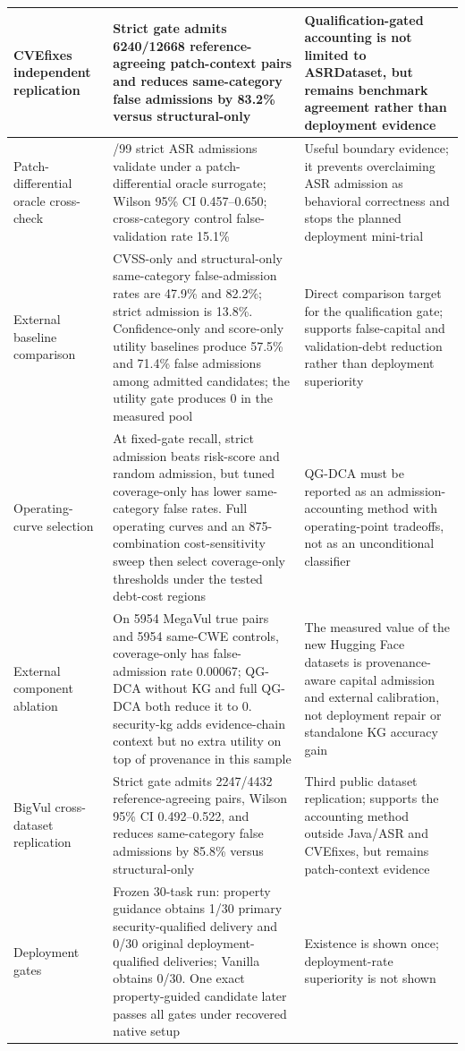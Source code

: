 ﻿\documentclass[lettersize,journal]{IEEEtran}
\begin{document}
\begin{table}[!t]
{\begin{tabular}{|>{\raggedright\arraybackslash}p{1.35in}|>{\raggedright\arraybackslash}p{2.25in}|>{\raggedright\arraybackslash}p{2.7in}|}
\hline
CVEfixes independent replication & Strict gate admits 6240/12668 reference-agreeing patch-context pairs and reduces same-category false admissions by 83.2\% versus structural-only & Qualification-gated accounting is not limited to ASRDataset, but remains benchmark agreement rather than deployment evidence \\
\hline
Patch-differential oracle cross-check & 55/99 strict ASR admissions validate under a patch-differential oracle surrogate; Wilson 95\% CI 0.457--0.650; cross-category control false-validation rate 15.1\% & Useful boundary evidence; it prevents overclaiming ASR admission as behavioral correctness and stops the planned deployment mini-trial \\
\hline
External baseline comparison & CVSS-only and structural-only same-category false-admission rates are 47.9\% and 82.2\%; strict admission is 13.8\%. Confidence-only and score-only utility baselines produce 57.5\% and 71.4\% false admissions among admitted candidates; the utility gate produces 0 in the measured pool & Direct comparison target for the qualification gate; supports false-capital and validation-debt reduction rather than deployment superiority \\
\hline
Operating-curve selection & At fixed-gate recall, strict admission beats risk-score and random admission, but tuned coverage-only has lower same-category false rates. Full operating curves and an 875-combination cost-sensitivity sweep then select coverage-only thresholds under the tested debt-cost regions & QG-DCA must be reported as an admission-accounting method with operating-point tradeoffs, not as an unconditional classifier \\
\hline
External component ablation & On 5954 MegaVul true pairs and 5954 same-CWE controls, coverage-only has false-admission rate 0.00067; QG-DCA without KG and full QG-DCA both reduce it to 0. security-kg adds evidence-chain context but no extra utility on top of provenance in this sample & The measured value of the new Hugging Face datasets is provenance-aware capital admission and external calibration, not deployment repair or standalone KG accuracy gain \\
\hline
BigVul cross-dataset replication & Strict gate admits 2247/4432 reference-agreeing pairs, Wilson 95\% CI 0.492--0.522, and reduces same-category false admissions by 85.8\% versus structural-only & Third public dataset replication; supports the accounting method outside Java/ASR and CVEfixes, but remains patch-context evidence \\
\hline
Deployment gates & Frozen 30-task run: property guidance obtains 1/30 primary security-qualified delivery and 0/30 original deployment-qualified deliveries; Vanilla obtains 0/30. One exact property-guided candidate later passes all gates under recovered native setup & Existence is shown once; deployment-rate superiority is not shown \\
\hline
\end{tabular}
}
\end{table}
\end{document}
